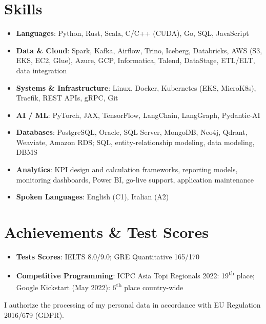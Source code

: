 \documentclass[a4paper,10pt]{article}
\newcommand{\resumeItemPlain}[1]{
  \item\small{
    {#1 \vspace{-2pt}}
  }
}
\newcommand{\resumeSubHeadingListStart}{\begin{itemize}[leftmargin=*]}
\newcommand{\resumeSubHeadingListEnd}{\end{itemize}}
\begin{document}
\section{Skills}
  \resumeSubHeadingListStart
    \resumeItemPlain{\textbf{Languages}: Python, Rust, Scala, C/C++ (CUDA), Go, SQL, JavaScript}
    \resumeItemPlain{\textbf{Data \& Cloud}: Spark, Kafka, Airflow, Trino, Iceberg, Databricks, AWS (S3, EKS, EC2, Glue), Azure, GCP, Informatica, Talend, DataStage, ETL/ELT, data integration}
    \resumeItemPlain{\textbf{Systems \& Infrastructure}: Linux, Docker, Kubernetes (EKS, MicroK8s), Traefik, REST APIs, gRPC, Git}
    \resumeItemPlain{\textbf{AI / ML}: PyTorch, JAX, TensorFlow, LangChain, LangGraph, Pydantic-AI}
    \resumeItemPlain{\textbf{Databases}: PostgreSQL, Oracle, SQL Server, MongoDB, Neo4j, Qdrant, Weaviate, Amazon RDS; SQL, entity-relationship modeling, data modeling, DBMS}
    \resumeItemPlain{\textbf{Analytics}: KPI design and calculation frameworks, reporting models, monitoring dashboards, Power BI, go-live support, application maintenance}
    \resumeItemPlain{\textbf{Spoken Languages}: English (C1), Italian (A2)}
  \resumeSubHeadingListEnd


\section{Achievements \& Test Scores}
  \resumeSubHeadingListStart
    \resumeItemPlain{\textbf{Tests Scores}: IELTS 8.0/9.0; GRE Quantitative 165/170}
    \resumeItemPlain{\textbf{Competitive Programming}: ICPC Asia Topi Regionals
    2022: 19\textsuperscript{th} place; Google Kickstart (May 2022):
    6\textsuperscript{th} place country-wide}
         
  \resumeSubHeadingListEnd

\begin{center}
\scriptsize I authorize the processing of my personal data in accordance with EU Regulation 2016/679 (GDPR).
\end{center}

\end{document}
